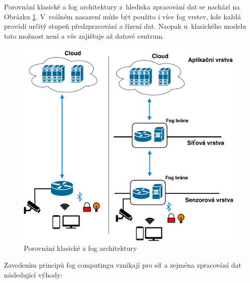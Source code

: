  Porovnání klasické a fog architektury z~hlediska zpracování dat se nachází
 na Obrázku \ref{obr.fog}. V~reálném nasazení může
 být použito i více fog vrstev, kde každá provádí určitý stupeň předzpracování a řízení
 dat. Naopak u~klasického modelu tato možnost není a vše zajišťuje až datové centrum.
\begin{figure}[ht]
\begin{center}
\includegraphics[scale=0.45]{pictures/fog-arch}
\caption{Porovnání klasické a fog architektury}
\label{obr.fog}
\end{center}
\end{figure}
 Zavedením principů fog computingu vznikají pro síť a zejména zpracování dat následující výhody:
